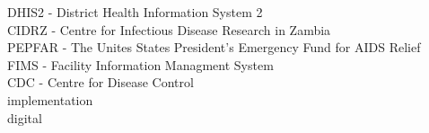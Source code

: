 \documentclass[conference]{IEEEtran}
\begin{document}
\maketitle
\begin{IEEEkeywords}
DHIS2 - District Health Information System 2\\
CIDRZ - Centre for Infectious Disease Research in Zambia\\
PEPFAR - The Unites States President's Emergency Fund for AIDS Relief\\
FIMS - Facility Information Managment System\\
CDC - Centre for Disease Control\\
implementation\\
digital\\

\end{IEEEkeywords}
\end{document}

